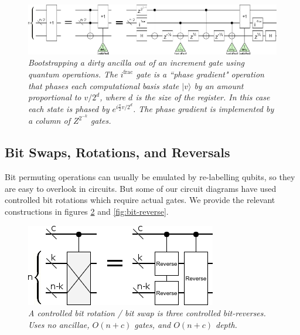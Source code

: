\documentclass[twocolumn]{article}
\begin{document}
\begin{figure}
  \centering
  \includegraphics[width=\linewidth]{assets/ancilla-bootstrap.png}
  \caption{\em Bootstrapping a dirty ancilla out of an increment gate using quantum operations.
  The $i^{\text{frac}}$ gate is a ``phase gradient" operation that phases each computational basis state $|v\rangle$ by an amount proportional to $v/2^d$, where $d$ is the size of the register.
  In this case each state is phased by $e^{i \frac{\pi}{2} v/2^d}$.
  The phase gradient is implemented by a column of $Z^{2^{-k}}$ gates.}
  \label{fig:bootstrap-ancilla}
\end{figure}


\subsection{Bit Swaps, Rotations, and Reversals}

Bit permuting operations can usually be emulated by re-labelling qubits, so they are easy to overlook in circuits.
But some of our circuit diagrams have used controlled bit rotations which require actual gates.
We provide the relevant constructions in figures \ref{fig:bit-rotate} and \ref{fig:bit-reverse}.

\begin{figure}
  \centering
  \includegraphics[width=\linewidth]{assets/controlled-bit-rotate.png}
  \caption{\em
    A controlled bit rotation / bit swap is three controlled bit-reverses.
    Uses no ancillae, $O(n+c)$ gates, and $O(n+c)$ depth.
  }
  \label{fig:bit-rotate}
\end{figure}
\end{document}

